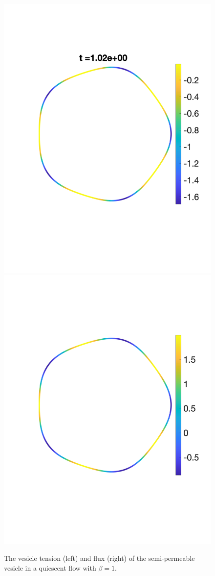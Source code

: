 \documentclass[9pt,twocolumn,twoside,lineno]{pnas-new}
\begin{document}
\begin{figure}[htp]
  \includegraphics[width=0.48\linewidth,trim =2cm 5cm 0cm 5cm, clip=true]{figures/StarTensionTime5.pdf}
  \includegraphics[width=0.48\linewidth,trim =2cm 5cm 0cm 5cm, clip=true]{figures/StarFluxTime5.pdf}
  \caption{\label{fig:starTensionFlux} The vesicle tension (left) and
  flux (right) of the semi-permeable vesicle in a quiescent flow with
  $\beta=1$.}
\end{figure}
\end{document}
